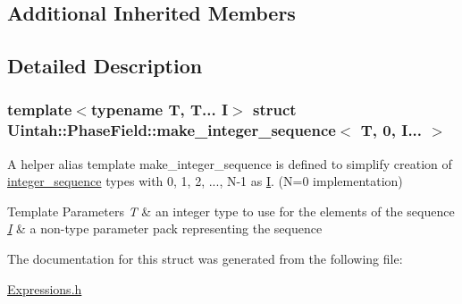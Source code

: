 \subsection*{Additional Inherited Members}


\subsection{Detailed Description}
\subsubsection*{template$<$typename T, T... I$>$\newline
struct Uintah\+::\+Phase\+Field\+::make\+\_\+integer\+\_\+sequence$<$ T, 0, I... $>$}

A helper alias template make\+\_\+integer\+\_\+sequence is defined to simplify creation of \hyperlink{structUintah_1_1PhaseField_1_1integer__sequence}{integer\+\_\+sequence} types with 0, 1, 2, ..., N-\/1 as \hyperlink{structUintah_1_1PhaseField_1_1I}{I}. (N=0 implementation)


\begin{DoxyTemplParams}{Template Parameters}
{\em T} & an integer type to use for the elements of the sequence \\
\hline
{\em \hyperlink{structUintah_1_1PhaseField_1_1I}{I}} & a non-\/type parameter pack representing the sequence \\
\hline
\end{DoxyTemplParams}


The documentation for this struct was generated from the following file\+:\begin{DoxyCompactItemize}
\item 
\hyperlink{Expressions_8h}{Expressions.\+h}\end{DoxyCompactItemize}
